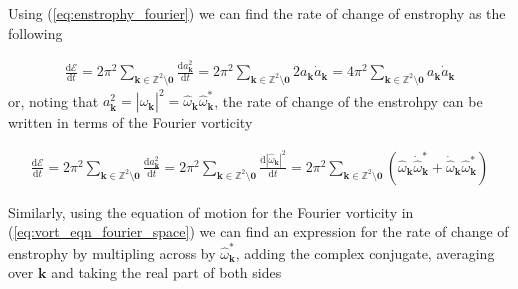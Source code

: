 \documentclass[9pt]{article}
\newcommand{\der}[2]{\frac{\mathrm{d}#1}{\mathrm{d}#2}}          	 %
\newcommand{\omegahat}[1]{\hat{\omega}_{ \mathbf{#1} } }								%
\newcommand{\bfk}{\mathbf{k}}								%
\begin{document}
Using (\ref{eq:enstrophy_fourier}) we can find the rate of change of enstrophy as the following

\begin{align}
\der{\mathcal{E}}{t} = 2\pi^2 \sum_{\mathbf{k}\in \mathbb{Z}^2\setminus \mathbf{0}} \der{a_{\bfk}^2}{t}  = 2\pi^2 \sum_{\mathbf{k}\in \mathbb{Z}^2\setminus \mathbf{0}} 2 a_{\bfk} \dot{a}_{\bfk} = 4\pi^2 \sum_{\mathbf{k}\in \mathbb{Z}^2\setminus \mathbf{0}} a_{\bfk} \dot{a}_{\bfk}
\end{align}
or, noting that $a_{\bfk}^2 = |\hat{\omega}_{\bfk}|^2 = \hat{\omega}_{\bfk}\hat{\omega}_{\bfk}^{*}$, the rate of change of the enstrohpy can be written in terms of the Fourier vorticity


\begin{align}
	\der{\mathcal{E}}{t} = 2\pi^2 \sum_{\mathbf{k}\in \mathbb{Z}^2\setminus \mathbf{0}} \der{a_{\bfk}^2}{t} = 2\pi^2 \sum_{\mathbf{k}\in \mathbb{Z}^2\setminus \mathbf{0}}\der{|\hat{\omega}_{\bfk}|^2}{t} = 2\pi^2 \sum_{\mathbf{k}\in \mathbb{Z}^2\setminus \mathbf{0}} (\hat{\omega}_{\bfk} \dot{\hat{\omega}}^{*}_{\bfk} + \dot{\hat{\omega}}_{\bfk} \hat{\omega}^{*}_{\bfk})
\end{align}

Similarly, using the equation of motion for the Fourier vorticity in (\ref{eq:vort_eqn_fourier_space}) we can find an expression for the rate of change of enstrophy by multipling across by $\omegahat{k}^*$, adding the complex conjugate, averaging over $\bfk$ and taking the real part of both sides
\end{document}
